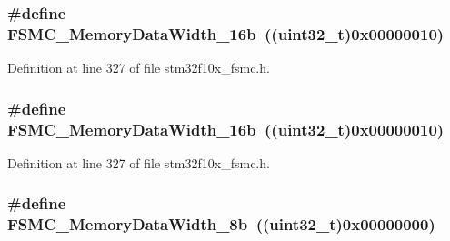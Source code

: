 \subsubsection[{\texorpdfstring{F\+S\+M\+C\+\_\+\+Memory\+Data\+Width\+\_\+16b}{FSMC_MemoryDataWidth_16b}}]{\setlength{\rightskip}{0pt plus 5cm}\#define F\+S\+M\+C\+\_\+\+Memory\+Data\+Width\+\_\+16b~(({\bf uint32\+\_\+t})0x00000010)}\hypertarget{group___f_s_m_c___data___width_ga65d85c3072e6790ae760ca2248e46df6}{}\label{group___f_s_m_c___data___width_ga65d85c3072e6790ae760ca2248e46df6}


Definition at line 327 of file stm32f10x\+\_\+fsmc.\+h.

\subsubsection[{\texorpdfstring{F\+S\+M\+C\+\_\+\+Memory\+Data\+Width\+\_\+16b}{FSMC_MemoryDataWidth_16b}}]{\setlength{\rightskip}{0pt plus 5cm}\#define F\+S\+M\+C\+\_\+\+Memory\+Data\+Width\+\_\+16b~(({\bf uint32\+\_\+t})0x00000010)}\hypertarget{group___f_s_m_c___data___width_ga65d85c3072e6790ae760ca2248e46df6}{}\label{group___f_s_m_c___data___width_ga65d85c3072e6790ae760ca2248e46df6}


Definition at line 327 of file stm32f10x\+\_\+fsmc.\+h.

\subsubsection[{\texorpdfstring{F\+S\+M\+C\+\_\+\+Memory\+Data\+Width\+\_\+8b}{FSMC_MemoryDataWidth_8b}}]{\setlength{\rightskip}{0pt plus 5cm}\#define F\+S\+M\+C\+\_\+\+Memory\+Data\+Width\+\_\+8b~(({\bf uint32\+\_\+t})0x00000000)}\hypertarget{group___f_s_m_c___data___width_ga5753e089830f19af70a724766e3c329f}{}\label{group___f_s_m_c___data___width_ga5753e089830f19af70a724766e3c329f}


